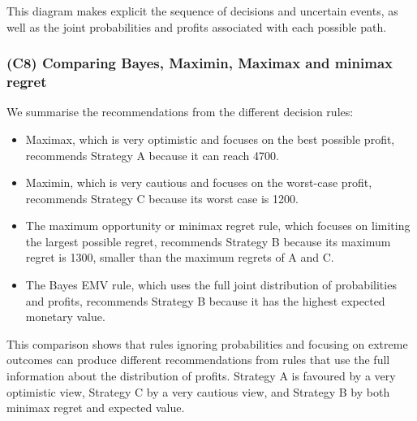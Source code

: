 \documentclass[11pt]{article}
\begin{document}
\begin{center}
	\end{center}
	
	This diagram makes explicit the sequence of decisions and uncertain events, as well as the joint probabilities and
	profits associated with each possible path.
	
	\subsubsection{(C8) Comparing Bayes, Maximin, Maximax and minimax regret}\label{subsubsec:example2-c8}
	
	We summarise the recommendations from the different decision rules:
	\begin{itemize}
		\item Maximax, which is very optimistic and focuses on the best possible profit, recommends Strategy A because it can reach 4700.
		\item Maximin, which is very cautious and focuses on the worst-case profit, recommends Strategy C because its worst case is 1200.
		\item The maximum opportunity or minimax regret rule, which focuses on limiting the largest possible regret, recommends Strategy B because its maximum regret is 1300, smaller than the maximum regrets of A and C.
		\item The Bayes EMV rule, which uses the full joint distribution of probabilities and profits, recommends Strategy B because it has the highest expected monetary value.
	\end{itemize}
	This comparison shows that rules ignoring probabilities and focusing on extreme outcomes can produce different recommendations from rules that use the full information about the distribution of profits. Strategy A is favoured by a very optimistic view, Strategy C by a very cautious view, and Strategy B by both minimax regret and expected value.
	
\end{document}
